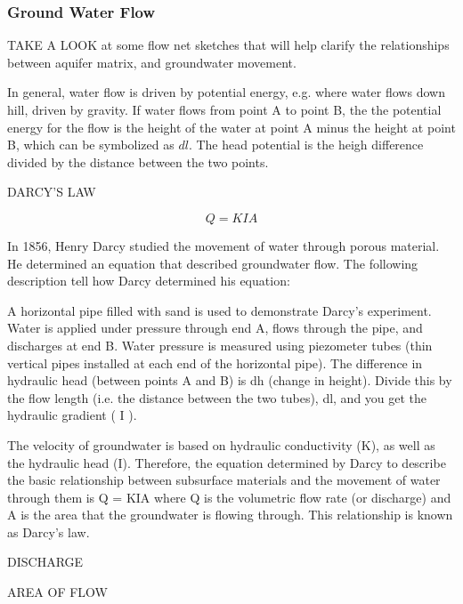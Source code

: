 \documentclass{book}\usepackage{knitr}
\begin{document}
\begin{knitrout}
\begin{kframe}
\subsubsection{Ground Water Flow}

TAKE A LOOK at some flow net sketches that will help clarify the relationships between aquifer matrix, and groundwater movement.

In general, water flow is driven by potential energy, e.g.  where water flows down hill, driven by gravity. If water flows from point A to point B, the the potential energy for the flow is the height of the water at point A minus the height at point B, which can be symbolized as $dl$. The head potential is the heigh difference divided by the distance between the two points.  

DARCY'S LAW

\begin{equation}
Q = KIA
\end{equation}

In 1856, Henry Darcy studied the movement of water through porous material. He determined an equation that described groundwater flow. The following description tell how Darcy determined his equation:

A horizontal pipe filled with sand is used to demonstrate Darcy's experiment. Water is applied under pressure through end A, flows through the pipe, and discharges at end B. Water pressure is measured using piezometer tubes (thin vertical pipes installed at each end of the horizontal pipe). The difference in hydraulic head (between points A and B) is dh (change in height). Divide this by the flow length (i.e. the distance between the two tubes), dl, and you get the hydraulic gradient ( I ).

The velocity of groundwater is based on hydraulic conductivity (K), as well as the hydraulic head (I). Therefore, the equation determined by Darcy to describe the basic relationship between subsurface materials and the movement of water through them is Q = KIA where Q is the volumetric flow rate (or discharge) and A is the area that the groundwater is flowing through. This relationship is known as Darcy’s law.

DISCHARGE

AREA OF FLOW


\end{kframe}
\end{knitrout}
\end{document}
